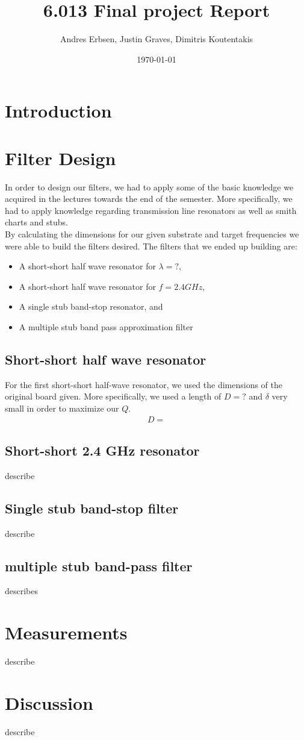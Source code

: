 \documentclass[letterpaper, 12pt]{article}
\begin{document}
\title{6.013 Final project Report}
\author{Andres Erbsen, Justin Graves, Dimitris Koutentakis}
\date{\today}
\maketitle
\vspace{5mm}
\tableofcontents
\clearpage
\section{Introduction}
\section{Filter Design}
In order to design our filters, we had to apply some of the basic knowledge we acquired in the lectures towards the end of the semester. More specifically, we had to apply knowledge regarding transmission line resonators as well as smith charts and stubs.
\\
By calculating the dimensions for our given substrate and target frequencies we were able to build the filters desired. The filters that we ended up building are:
\begin{itemize}
    \item A short-short half wave resonator for $\lambda=?$,
    \item A short-short half wave resonator for $f=2.4 GHz$,
    \item A single stub band-stop resonator, and
    \item A multiple stub band pass approximation filter
\end{itemize}
\subsection{Short-short half wave resonator}
For the first short-short half-wave resonator, we used the dimensions of the original board given. More specifically, we used a length of $D=?$ and $\delta$ very small in order to maximize our $Q$. 
\begin{align*}
    D=
\end{align*}
\subsection{Short-short 2.4 GHz resonator}
describe
\subsection{Single stub band-stop filter}
describe
\subsection{multiple stub band-pass filter}
describes
\section{Measurements}
describe
\section{Discussion}
describe
\end{document}
